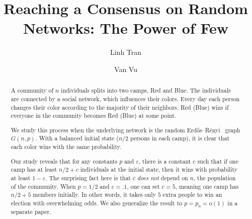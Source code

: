 \documentclass{toc}
\newcommand{\err}{Erd\H{o}s--R{\'e}nyi}
\begin{document}
	
	\begin{frontmatter}%
		
		
		
		
\title{Reaching a Consensus on Random Networks: The Power of Few%
%
}  %
%
				
				
				
				
				
				\author[tran]{Linh Tran}
				\author[vu]{Van Vu}
				
				
				\begin{abstract}
					A community of $n$ individuals splits into two camps, Red and Blue. The individuals are connected by a social network, which influences their colors.
					Every day   %
					each person changes %
					their  %
					color according to the majority of %
					their  %
					neighbors. Red (Blue) wins if everyone in the community becomes Red (Blue) 
					at some point.
					
					We study this process when the underlying network is the random 
					\err\  %
					graph $G(n, p)$. With a balanced initial state ($n/2$ persons in each camp),
					it is clear that each color wins with the same probability.
					
					Our study reveals that for any  constants $p$ and $\varepsilon$,
					there is a constant $c$ such that if one camp has at least $n/2 + c$ individuals at the initial state, then
					it wins with probability at least $1 - \varepsilon$. The surprising fact here is that $c$ \emph{does not} depend on $n$, the population of the community. When $p=1/2$ and $\varepsilon =.1$, one can set $c=5$, meaning one camp has $n/2 + 5$ members initially. In other words, it takes only $5$ extra people to win an election with overwhelming odds.
					We also generalize the result to $p = p_n = \text{o}(1)$ in a separate paper.
				\end{abstract}
				
				
				%
				
			\end{frontmatter}
			
\end{document}
